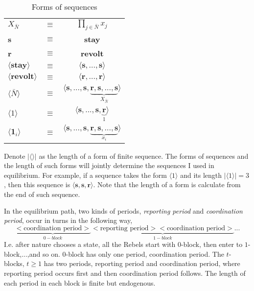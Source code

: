 \documentclass[12pt,letter]{article}
\theoremstyle{definition}
\theoremstyle{remark}
\theoremstyle{claim}
\begin{document}
\begin{table}[t]
\caption{Forms of sequences}
\label{Table_msg_form}
\begin{center}
\begin{tabular}{l c c}
$X_{\bar{N}}$ 								& $\equiv$ 			& $\prod_{j\in \bar{N}}x_j$  \\
\textbf{s}										& $\equiv$ 			& \textbf{stay}  \\
\textbf{r}										& $\equiv$ 			& \textbf{revolt}  \\
$\langle \textbf{stay} \rangle$ 		& $\equiv$ 			& $\langle \textbf{s},...,\textbf{s}\rangle$  \\
$\langle \textbf{revolt} \rangle$ 	& $\equiv$ 			& $\langle \textbf{r},...,\textbf{r}\rangle$  \\
$\langle  \bar{N} \rangle$ 				& $\equiv$ 			& $\langle \textbf{s},...,\textbf{s},\underbrace{\textbf{r},\textbf{s},...,\textbf{s}}_{X_{ \bar{N}}}\rangle$  \\

$\langle 1 \rangle$	 					& $\equiv$ 			& $\langle \textbf{s},...,\textbf{s},\underbrace{\textbf{r}}_{1}\rangle$  \\
$\langle \mathbf{1}_i \rangle$	 	& $\equiv$ 			& $\langle \textbf{s},...,\textbf{s},\underbrace{\textbf{r},\textbf{s},...,\textbf{s}}_{x_i}\rangle$  \\
\end{tabular}
\end{center}
\end{table}

Denote $|\langle\rangle|$ as the length of a form of finite sequence. The forms of sequences and the length of such forms will jointly determine the sequences I used in equilibrium. For example, if a sequence takes the form $\langle 1 \rangle$ and its length $|\langle 1 \rangle|=3$, then this sequence is $\langle \textbf{s},\textbf{s},\textbf{r}\rangle$. Note that the length of a form is calculate from the end of such sequence.

In the equilibrium path, two kinds of periods, \textit{reporting period} and \textit{coordination period}, occur in turns in the following way,
\[\underbrace{<\text{coordination period}>}_{0-block}\underbrace{<\text{reporting period}><\text{coordination period}>}_{1-block}...\]
I.e. after nature chooses a state, all the Rebels start with $0$-block, then enter to $1$-block,...,and so on. $0$-block has only one period, coordination period. The $t$-blocks, $t\geq 1$ has two periods, reporting period and coordination period, where reporting period occurs first and then coordination period follows. The length of each period in each block is finite but endogenous.
\end{document}
